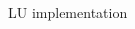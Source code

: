 \begin{frame}{LU implementation}
\begin{columns}[c]
\begin{column}{0.35\textwidth}
    \end{column}
  \end{columns}

\end{frame}

